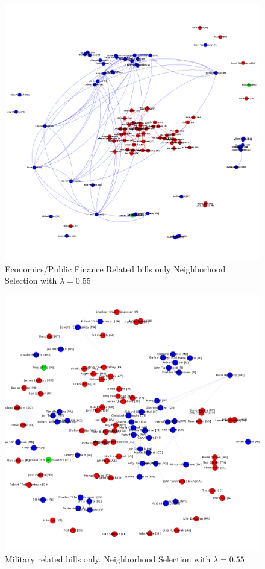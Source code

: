 \documentclass{article}
\begin{document}
\begin{figure} 
\caption{\label{fig: ec55}Economics/Public Finance Related bills only Neighborhood Selection with $\lambda = 0.55$}
  \includegraphics[width=\textwidth]{econ_nbd_55.png}
\end{figure}
\begin{figure} 
\caption{\label{fig: mil55}Military related bills only. Neighborhood Selection with $\lambda = 0.55$}
  \includegraphics[width=\textwidth]{military.png}
\end{figure}
\end{document}

